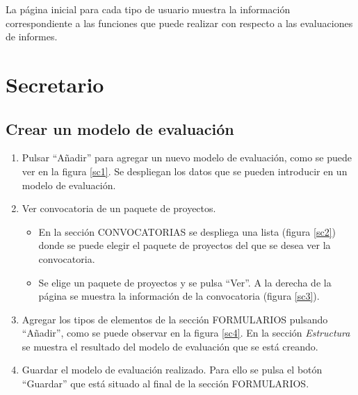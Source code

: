 \documentclass[11pt,a4paper,spanish,twoside]{book}
\begin{document}
La página inicial para cada tipo de usuario muestra la información 
co\-rres\-pon\-dien\-te a las funciones que puede realizar con respecto a las 
evaluaciones de informes.


\section{Secretario}
\subsection{Crear un modelo de evaluación}
\begin{enumerate}
\item Pulsar ``Añadir'' para agregar un nuevo modelo de evaluación, como se 
  puede ver en la figura \ref{sc1}. Se despliegan los datos que se pueden 
  introducir en un modelo de evaluación.
  

\item Ver convocatoria de un paquete de proyectos.
  \begin{itemize}
  \item En la sección CONVOCATORIAS se despliega una lista (figura \ref{sc2}) 
    donde se puede elegir el paquete de proyectos del que se desea ver la 
    convocatoria.


  \item Se elige un paquete de proyectos y se pulsa ``Ver''. A la derecha de la 
    página se muestra la información de la convocatoria (figura \ref{sc3}).

  \end{itemize}

\item Agregar los tipos de elementos de la sección FORMULARIOS pulsando 
  ``Añadir'', como se puede observar en la figura \ref{sc4}. En la sección 
  \emph{Estructura} se muestra el resultado del modelo de evaluación que se
  está creando.


\item Guardar el modelo de evaluación realizado. Para ello se pulsa el botón 
  ``Guardar'' que está situado al final de la sección FORMULARIOS.
\end{enumerate}
\end{document}
